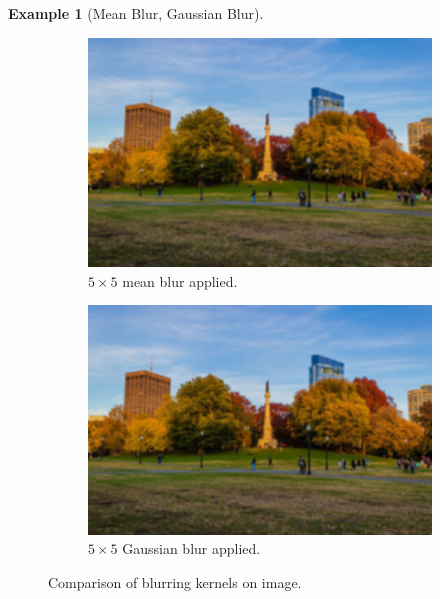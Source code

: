 \documentclass{article}
\theoremstyle{definition}
\newtheorem{example}{Example}[section]
\theoremstyle{remark}
\theoremstyle{definition}
\begin{document}
\begin{example}[Mean Blur, Gaussian Blur]
\begin{figure}[hbt!]
\begin{subfigure}[b]{0.32\textwidth}
    \centering
        \includegraphics[width=\textwidth]{Images/OpenCV/Mean_Blur.png}
        \caption{$5 \times 5$ mean blur applied. }
        \label{fig:mean_blur_image}
    \end{subfigure}
    \begin{subfigure}[b]{0.32\textwidth}
    \centering
        \includegraphics[width=\textwidth]{Images/OpenCV/Gaussian_Blur.png}
        \caption{$5 \times 5$ Gaussian blur applied. }
        \label{fig:normal_blur_image}
    \end{subfigure}

    \caption{Comparison of blurring kernels on image. }
    \label{fig:blur}
\end{figure}
\end{example}
\end{document}
